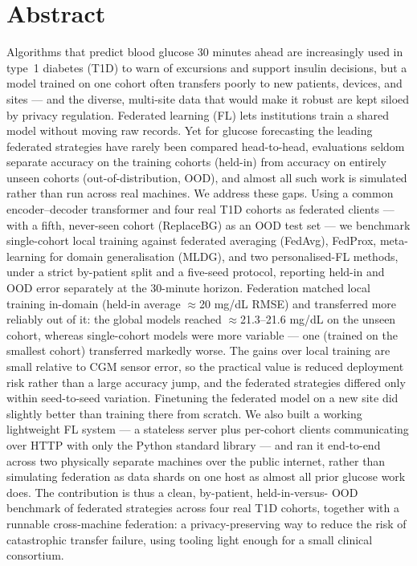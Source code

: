 \documentclass[10pt,letterpaper]{article}
\begin{document}
\section*{Abstract}
Algorithms that predict blood glucose 30 minutes ahead are increasingly used in
type~1 diabetes (T1D) to warn of excursions and support insulin decisions, but a
model trained on one cohort often transfers poorly to new patients, devices, and
sites --- and the diverse, multi-site data that would make it robust are kept
siloed by privacy regulation. Federated learning (FL) lets institutions train a
shared model without moving raw records. Yet for glucose forecasting the leading
federated strategies have rarely been compared head-to-head, evaluations seldom
separate accuracy on the training cohorts (held-in) from accuracy on entirely
unseen cohorts (out-of-distribution, OOD), and almost all such work is simulated
rather than run across real machines. We address these gaps. Using a common
encoder--decoder transformer and four real T1D cohorts as federated clients ---
with a fifth, never-seen cohort (ReplaceBG) as an OOD test set --- we benchmark
single-cohort local training against federated averaging (FedAvg), FedProx,
meta-learning for domain generalisation (MLDG), and two personalised-FL methods,
under a strict by-patient split and a five-seed protocol, reporting held-in and
OOD error separately at the 30-minute horizon. Federation matched local training
in-domain (held-in average $\approx$20 mg/dL RMSE) and transferred more reliably
out of it: the global models reached $\approx$21.3--21.6 mg/dL on the unseen
cohort, whereas single-cohort models were more variable --- one (trained on the
smallest cohort) transferred markedly worse. The gains over local training are
small relative to CGM sensor error, so the practical value is reduced deployment
risk rather than a large accuracy jump, and the federated strategies differed
only within seed-to-seed variation. Finetuning the federated model on a new site
did slightly better than training there from scratch. We also built a working
lightweight FL system --- a stateless server plus per-cohort clients
communicating over HTTP with only the Python standard library --- and ran it
end-to-end across two physically separate machines over the public internet,
rather than simulating federation as data shards on one host as almost all prior
glucose work does. The contribution is thus a clean, by-patient, held-in-versus-
OOD benchmark of federated strategies across four real T1D cohorts, together with
a runnable cross-machine federation: a privacy-preserving way to reduce the risk
of catastrophic transfer failure, using tooling light enough for a small clinical
consortium.
\end{document}
